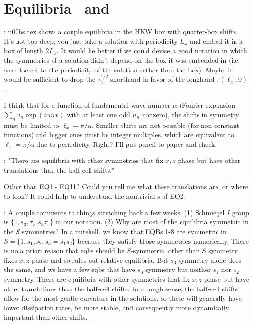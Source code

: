    \section{Equilibria \tEQsev\ and \tEQeight}
   \label{sect:EQ8}

\medskip{}:
n00bs.tex shows a couple equilibria in the HKW box with quarter-box
shifts. It's not too deep; you just take a solution with periodicity
$L_x$ and embed it in a box of length $2 L_x$. It would be better if
we could devise a good notation in which the symmetries of a solution
didn't depend on the box it was embedded in (i.e. were locked to the
periodicity of the solution rather than the box). Maybe it would be
sufficient to drop the $\tau_x^{1/2}$ shorthand in favor of the
longhand $\tau(\ell_x, 0)$.

I think that for a function of fundamental wave number $\alpha$
(Fourier expansion $\sum_n u_n \exp(i \alpha n x)$ with at least one
odd $u_n$ nonzero), the shifts in symmetry must be limited to $\ell_x =
\pi/\alpha$. Smaller shifts are not possible (for non-constant
functions) and bigger ones must be integer multiples, which are
equivalent to $\ell_x = \pi/\alpha$ due to periodicity. Right? I'll
put pencil to paper and check.

\medskip{}:
   "There are equilibria with other symmetries
that fix $x,z$ phase but have other translations than the half-cell
shifts."

Other than EQ1 - EQ11? Could you tell me what these translations
are, or where to look? It could help to understand the nontrivial
\stagp s of EQ2.

\medskip{}:
A couple comments to things stretching back a few weeks: (1) Schmiegel
$I$ group is $\{1, s_3, \tau_z, s_3 \tau_z\}$ in our notation. (2)
Why are most of the equilibria symmetric in the $S$ symmetries? In a nutshell,
we know that EQBs 1-8 are symmetric in $S = \{1, s_1, s_2, s_3 = s_1
s_2\}$ because they satisfy those symmetries numerically. There is no
a priori reason that eqbs should be $S$-symmetric, other than $S$ symmetry
fixes $x,z$ phase and so rules out relative equilibria. But $s_3$ symmetry
alone does the same, and we have a few eqbs that have $s_3$ symmetry
but neither $s_1$ nor $s_2$ symmetry. There are equilibria with other symmetries
that fix $x,z$ phase but have other translations than the half-cell shifts.
In a rough sense, the half-cell shifts allow for the most gentle curvature
in the solutions, so these will generally have lower dissipation rates, be
more stable, and consequently more dynamically important than other shifts.

